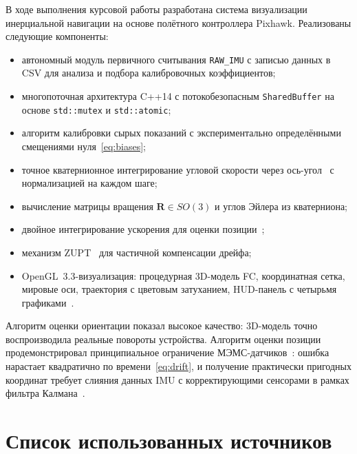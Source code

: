 В ходе выполнения курсовой работы разработана система визуализации
инерциальной навигации на основе полётного контроллера Pixhawk.
Реализованы следующие компоненты:
\begin{itemize}[leftmargin=2cm]
    \item автономный модуль первичного считывания \texttt{RAW\_IMU} с записью
          данных в CSV для анализа и подбора калибровочных коэффициентов;
    \item многопоточная архитектура C++14 с потокобезопасным
          \texttt{SharedBuffer} на основе \texttt{std::mutex} и
          \texttt{std::atomic};
    \item алгоритм калибровки сырых показаний с экспериментально
          определёнными смещениями нуля~\eqref{eq:biases};
    \item точное кватернионное интегрирование угловой скорости через
          ось-угол~\cite{kuipers1999} с нормализацией на каждом шаге;
    \item вычисление матрицы вращения $\mathbf{R}\in SO(3)$ и углов Эйлера
          из кватерниона;
    \item двойное интегрирование ускорения для оценки позиции~\cite{groves2013};
    \item механизм ZUPT~\cite{skog2010} для частичной компенсации дрейфа;
    \item OpenGL~3.3-визуализация: процедурная 3D-модель FC, координатная
          сетка, мировые оси, траектория с цветовым затуханием, HUD-панель
          с четырьмя графиками~\cite{glfw_docs}.
\end{itemize}
 
Алгоритм оценки ориентации показал высокое качество: 3D-модель точно
воспроизводила реальные повороты устройства. Алгоритм оценки позиции
продемонстрировал принципиальное ограничение МЭМС-датчиков~\cite{titterton2004}:
ошибка нарастает квадратично по времени~\eqref{eq:drift}, и получение
практически пригодных координат требует слияния данных IMU с корректирующими
сенсорами в рамках фильтра Калмана~\cite{groves2013}.
 
\newpage
 
\section*{Список использованных источников}
 
